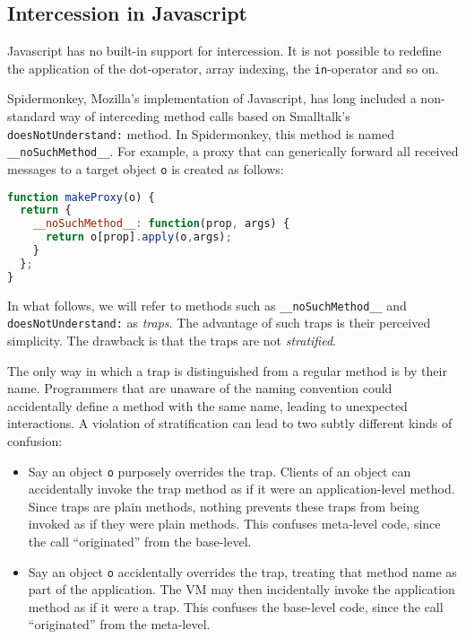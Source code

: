 \documentclass{acm_proc_article-sp}
\newcommand{\noSuchMethod}{\texttt{\_\_noSuchMethod\_\_}}
\begin{document}
\subsection{Intercession in Javascript}
\label{sub:intercession_in_javascript}

Javascript has no built-in support for intercession. It is not possible to redefine the application of the dot-operator, array indexing, the \texttt{in}-operator and so on.

Spidermonkey, Mozilla's implementation of Javascript, has long included a non-standard way of interceding method calls based on Smalltalk's \texttt{doesNotUnderstand:} method. In Spidermonkey, this method is named \noSuchMethod{}. For example, a proxy that can generically forward all received messages to a target object \texttt{o} is created as follows:

\begin{lstlisting}[language=javascript]
function makeProxy(o) {
  return {
    __noSuchMethod__: function(prop, args) {
      return o[prop].apply(o,args);
    }
  };
}
\end{lstlisting}

In what follows, we will refer to methods such as \noSuchMethod{} and \texttt{doesNotUnderstand:} as \emph{traps}. The advantage of such traps is their perceived simplicity. The drawback is that the traps are not \emph{stratified}.

The only way in which a trap is distinguished from a regular method is by their name. Programmers that are unaware of the naming convention could accidentally define a method with the same name, leading to unexpected interactions. A violation of stratification can lead to two subtly different kinds of confusion:

\begin{itemize}
  \item Say an object \texttt{o} purposely overrides the trap. Clients of an object can accidentally invoke the trap method as if it were an application-level method. Since traps are plain methods, nothing prevents these traps from being invoked as if they were plain methods. This confuses meta-level code, since the call ``originated'' from the base-level.
  \item Say an object \texttt{o} accidentally overrides the trap, treating that method name as part of the application. The VM may then incidentally invoke the application method as if it were a trap. This confuses the base-level code, since the call ``originated'' from the meta-level.
\end{itemize}
\end{document}
